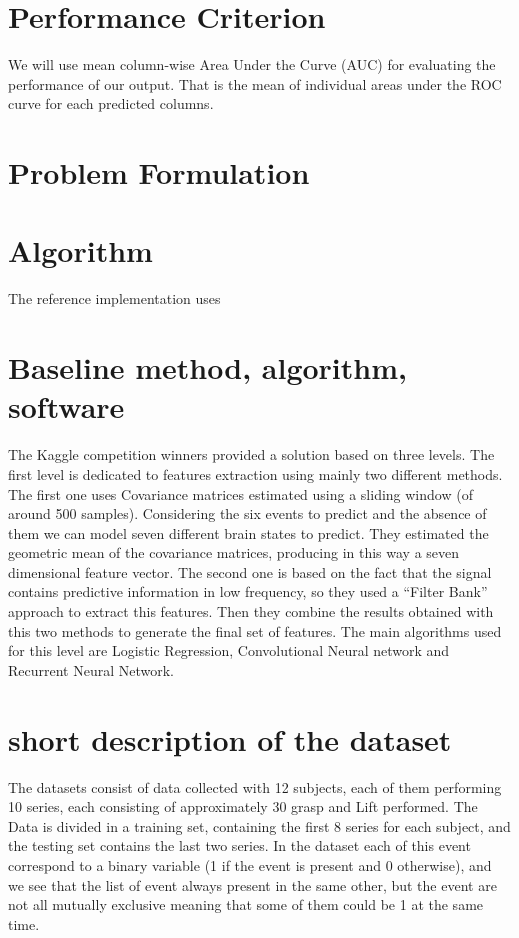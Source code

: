 \documentclass[final,leqno,onefignum,onetabnum]{siamltexmm}
\begin{document}
  \section{Performance Criterion}
  We will use mean column-wise Area Under the Curve (AUC) for evaluating the performance of our output.  That is the mean of individual areas under the ROC curve for each predicted columns.

  \section{Problem Formulation}

  \section{Algorithm}

  The reference implementation uses 


\section{Baseline method, algorithm, software}
The Kaggle competition winners\cite{kaggle} provided a solution based on three levels. The first level is dedicated to features extraction using mainly two different methods. The first one uses Covariance matrices  estimated using a sliding window (of around 500 samples). Considering the six events to predict and the absence of them we can model seven different brain states to predict. They estimated the geometric mean of the covariance matrices, producing in this way a seven dimensional feature vector. The second one is based on the fact that the signal contains predictive information in low frequency, so they used a ``Filter Bank'' approach to extract this features. Then they combine the results obtained with this two methods to generate the final set of features. 
The main algorithms used for this level are Logistic Regression, Convolutional Neural network and Recurrent Neural Network. 
 

\section{short description of the dataset}
The  datasets consist of data collected with 12 subjects, each of them performing 10 series, each consisting of approximately 30 grasp and Lift performed. The Data is divided in a  training set, containing the first 8 series for each subject, and  the testing set contains the last two series.
In the dataset each of this event correspond to a binary variable (1 if the event is present and 0 otherwise), and we see that the list of event always present in the same other, but the event are not all mutually exclusive meaning that some of  them could be 1 at the same time.  
 
\end{document}
